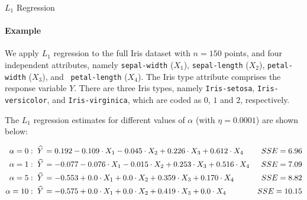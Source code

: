\begin{frame}{$L_1$ Regression}
\framesubtitle{Example}
    We apply $L_1$ regression to the full Iris dataset with $n=150$
    points, and four independent attributes, namely {\tt sepal-width}
    ($X_1$),
    {\tt sepal-length} ($X_2$), {\tt petal-width} ($X_3$), and {\tt
    petal-length} ($X_4$). The Iris type attribute comprises the
    response variable $Y$. 
    There are three
    Iris types, namely {\tt Iris-setosa}, {\tt Iris-versicolor}, and
    {\tt Iris-virginica}, which are coded as $0$, $1$ and $2$,
    respectively.

\medskip

    The $L_1$ regression estimates for different values of $\alpha$
    (with $\eta=0.0001$) are
    shown below:
\begin{small}
    \begin{align*}
        \alpha = 0:\; \mkern 1.5mu\widehat{\mkern-1.5muY}\mkern 1.5mu & = 0.192 -0.109 \cdot X_1 -0.045 \cdot X_2 + 
        0.226 \cdot X_3 + 0.612 \cdot X_4 & SSE = 6.96\\
        \alpha = 1:\; \mkern 1.5mu\widehat{\mkern-1.5muY}\mkern 1.5mu & = -0.077 -0.076 \cdot X_1 -0.015 \cdot X_2 + 
        0.253 \cdot X_3 + 0.516 \cdot X_4 & SSE = 7.09\\
            \alpha = 5:\; \mkern 1.5mu\widehat{\mkern-1.5muY}\mkern 1.5mu & = -0.553 + 0.0 \cdot X_1  + 0.0 \cdot X_2 + 
            0.359 \cdot X_3 + 0.170 \cdot X_4 & SSE = 8.82\\
            \alpha = 10:\; \mkern 1.5mu\widehat{\mkern-1.5muY}\mkern 1.5mu & = -0.575 + 0.0 \cdot X_1  + 0.0 \cdot X_2 + 
            0.419 \cdot X_3 + 0.0 \cdot X_4 & SSE = 10.15
    \end{align*}
\end{small}
\end{frame}

